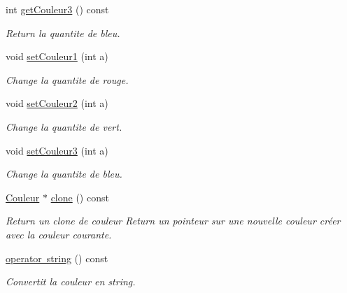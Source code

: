 \begin{DoxyCompactItemize}
int \mbox{\hyperlink{class_couleur_a0b48fffca467fe372414ea409b19f1fd}{get\+Couleur3}} () const
\begin{DoxyCompactList}\small\item\em Return la quantite de bleu. \end{DoxyCompactList}\item 
\mbox{\label{class_couleur_a8fae38cdd446da82e10d10ba6c8b7918}} 
void \mbox{\hyperlink{class_couleur_a8fae38cdd446da82e10d10ba6c8b7918}{set\+Couleur1}} (int a)
\begin{DoxyCompactList}\small\item\em Change la quantite de rouge. \end{DoxyCompactList}\item 
\mbox{\label{class_couleur_ab6fbf459e39b4b34971e33b2cc83dee9}} 
void \mbox{\hyperlink{class_couleur_ab6fbf459e39b4b34971e33b2cc83dee9}{set\+Couleur2}} (int a)
\begin{DoxyCompactList}\small\item\em Change la quantite de vert. \end{DoxyCompactList}\item 
\mbox{\label{class_couleur_a829fca164dcb1a7e6e7faff9fb1d373d}} 
void \mbox{\hyperlink{class_couleur_a829fca164dcb1a7e6e7faff9fb1d373d}{set\+Couleur3}} (int a)
\begin{DoxyCompactList}\small\item\em Change la quantite de bleu. \end{DoxyCompactList}\item 
\mbox{\label{class_couleur_ac660021e74e4e50e26485f9301bb6d45}} 
\mbox{\hyperlink{class_couleur}{Couleur}} $\ast$ \mbox{\hyperlink{class_couleur_ac660021e74e4e50e26485f9301bb6d45}{clone}} () const
\begin{DoxyCompactList}\small\item\em Return un clone de couleur Return un pointeur sur une nouvelle couleur créer avec la couleur courante. \end{DoxyCompactList}\item 
\mbox{\label{class_couleur_acff55563e5760e4cea32ca275eb62205}} 
\mbox{\hyperlink{class_couleur_acff55563e5760e4cea32ca275eb62205}{operator string}} () const
\begin{DoxyCompactList}\small\item\em Convertit la couleur en string. \end{DoxyCompactList}\end{DoxyCompactItemize}



